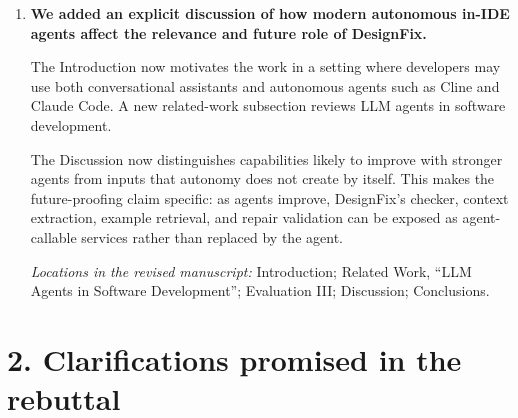 \documentclass[11pt]{article}
\newcommand{\location}[1]{%
  \par\nobreak\smallskip
  \textit{Locations in the revised manuscript:} #1.
}
\begin{document}
\begin{enumerate}
\item \textbf{We added an explicit discussion of how modern autonomous in-IDE
agents affect the relevance and future role of DesignFix.}

The Introduction now motivates the work in a setting where developers may use
both conversational assistants and autonomous agents such as Cline and Claude
Code.  A new related-work subsection reviews LLM agents in software
development. 

The Discussion now distinguishes capabilities likely to improve with stronger
agents from
inputs that autonomy does not create by itself.  This makes the future-proofing claim
specific: as agents improve, DesignFix's checker, context extraction, example
retrieval, and repair validation can be exposed as agent-callable services
rather than replaced by the agent.

\location{Introduction; Related Work, ``LLM Agents in Software Development'';
Evaluation III; Discussion; Conclusions}

\end{enumerate}

\section*{2. Clarifications promised in the rebuttal}
\end{document}
